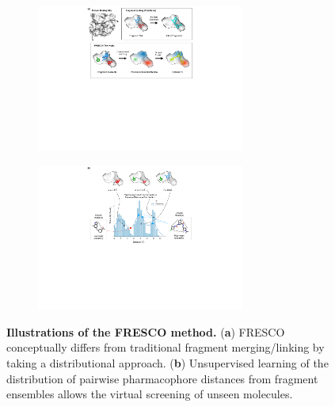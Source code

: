 \begin{figure}[!bh]
 \centering
 \begin{subfigure}{\textwidth}
 \centering
 \includegraphics[width=0.75\textwidth]{Chapters/Fresco/Figs/fresco_vs_linking_a.pdf}
 
 \end{subfigure}
 \hfill
 \begin{subfigure}{\textwidth}
 \centering
 \includegraphics[width=0.75\textwidth]{Chapters/Fresco/Figs/fresco_details.pdf}

 \end{subfigure}
 \caption{\textbf{Illustrations of the FRESCO method.} (\textbf{a}) FRESCO conceptually differs from traditional fragment merging/linking by taking a distributional approach. (\textbf{b}) Unsupervised learning of the distribution of pairwise pharmacophore distances from fragment ensembles allows the virtual screening of unseen molecules.}
 \label{fig:fresco_vs_linking}
\end{figure}

